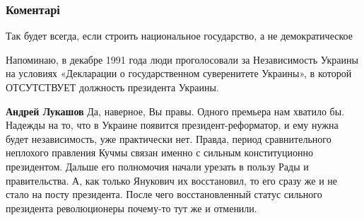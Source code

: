 
 
 
 
 
\subsubsection{Коментарі}
\label{sec:29_08_2021.fb.mischishin_mihail.1.elita_ukr_gosudarstvo.cmt}

\begin{itemize}
 
Так будет всегда, если строить национальное государство, а не демократическое

 

Напоминаю, в декабре 1991 года люди проголосовали за Независимость Украины на
условиях «Декларации о государственном суверенитете Украины», в которой
ОТСУТСТВУЕТ должность президента Украины.

\begin{itemize}
 
\textbf{Андрей Лукашов} Да, наверное, Вы правы. Одного премьера нам хватило бы.
Надежды на то, что в Украине появится президент-реформатор, и ему нужна будет
независимость, уже практически нет. Правда, период сравнительного неплохого
правления Кучмы связан именно с сильным конституционно президентом. Дальше его
полномочия начали урезать в пользу Рады и правительства. А, как только Янукович
их восстановил, то его сразу же и не стало на посту президента. После чего
восстановленный статус сильного президента революционеры почему-то тут же и
отменили.
\end{itemize}


\end{itemize}
